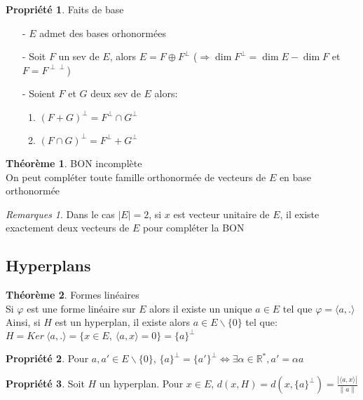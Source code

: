 \documentclass[fleqn]{article}
\theoremstyle{definition} \newtheorem*{defi}{D\'efinition}
\theoremstyle{definition} \newtheorem*{theo}{Th\'eor\`eme}
\theoremstyle{definition} \newtheorem*{coro}{Corollaire}
\theoremstyle{remark} \newtheorem*{rqs}{Remarques}
\theoremstyle{definition} \newtheorem*{prop}{Propri\'et\'e}
\begin{document}
\begin{prop} Faits de base
	\begin{enumerate}
		\item [-] $E$ admet des bases orhonorm\'ees
		\item [-] Soit $F$ un sev de $E$, alors $E = F \oplus F^\perp$ ($\Rightarrow \dim F^\perp = \dim E - \dim F$ et $F=F^{\perp \perp}$)
		\item [-] Soient $F$ et $G$ deux sev de $E$ alors:
			\begin{enumerate}
				\item $(F+G)^\perp = F^\perp \cap G^\perp$
				\item $(F\cap G)^\perp = F^\perp + G^\perp$
			\end{enumerate}
	\end{enumerate}
\end{prop}

\begin{theo} BON incompl\`ete\\
	On peut compl\'eter toute famille orthonorm\'ee de vecteurs de $E$ en base orthonorm\'ee
	\begin{rqs}
		Dans le cas $|E| = 2$, si $x$ est vecteur unitaire de $E$, il existe exactement deux vecteurs de $E$ pour compl\'eter la BON
	\end{rqs}
\end{theo}

\subsection{Hyperplans}

\begin{theo} Formes lin\'eaires \\
	Si $\varphi$ est une forme lin\'eaire sur $E$ alors il existe un unique $a \in E$ tel que $\varphi = \langle a,. \rangle$ \\
	Ainsi, si $H$ est un hyperplan, il existe alors $a \in E\backslash \{0\}$ tel que: \\$H = Ker\ \langle a,. \rangle = \{x \in E ,\ \langle a,x
	\rangle = 0\} = \{a\}^\perp$
\end{theo}

\begin{prop}
	Pour $a,a' \in E\backslash \{0\}$, $\{a\}^\perp = \{a'\}^\perp \Leftrightarrow \exists \alpha \in \mathbb{R}^*, a' = \alpha a$
\end{prop}

\begin{prop}
	Soit $H$ un hyperplan. Pour $x \in E$, $d(x,H) = d(x, \{a\}^\perp) = \frac {|\langle a,x \rangle|}{\|a\|}$
\end{prop}
\end{document}
